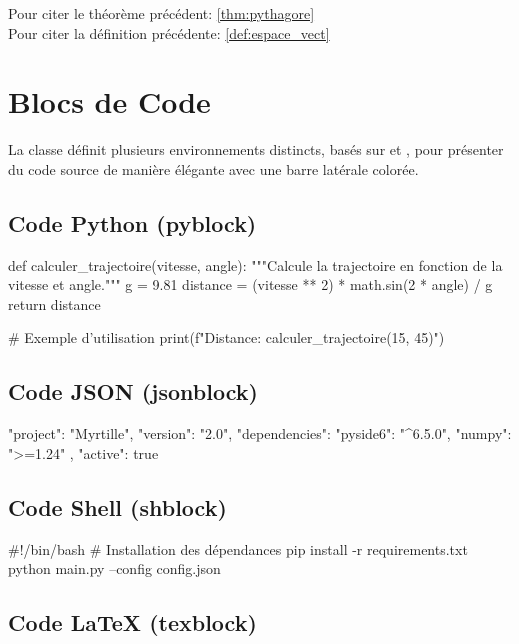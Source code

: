 \documentclass[theme=myrtille]{myrtille}
\begin{document}
Pour citer le théorème précédent: \ref{thm:pythagore}\\
Pour citer la définition précédente: \ref{def:espace_vect}

\section{Blocs de Code}
La classe définit plusieurs environnements distincts, basés sur  et , pour présenter du code source de manière élégante avec une barre latérale colorée.

\subsection{Code Python (pyblock)}
\begin{pyblock}
def calculer_trajectoire(vitesse, angle):
    """Calcule la trajectoire en fonction de la vitesse et angle."""
    g = 9.81
    distance = (vitesse ** 2) * math.sin(2 * angle) / g
    return distance

# Exemple d'utilisation
print(f"Distance: {calculer_trajectoire(15, 45)}")
\end{pyblock}

\subsection{Code JSON (jsonblock)}
\begin{jsonblock}
{
  "project": "Myrtille",
  "version": "2.0",
  "dependencies": {
    "pyside6": "^6.5.0",
    "numpy": ">=1.24"
  },
  "active": true
}
\end{jsonblock}

\subsection{Code Shell (shblock)}
\begin{shblock}
#!/bin/bash
# Installation des dépendances
pip install -r requirements.txt
python main.py --config config.json
\end{shblock}

\subsection{Code LaTeX (texblock)}

\end{document}
